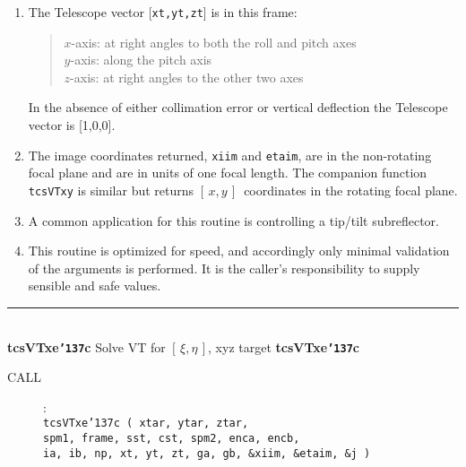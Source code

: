 \documentclass[12pt,fleqn,twoside]{article}
\renewcommand{\_}{{\tt\char'137}}     %
\newcommand{\radec}     {$[\,\alpha,\delta\,]$}
\newcommand{\hadec}     {$[\,h,\delta\,]$}
\newcommand{\xieta}     {$[\,\xi,\eta\,]$}
\newcommand{\azel}      {$[\,Az,El~]$}
\newcommand{\xy}        {$[\,x,y\,]$}
\newcommand{\routine}[2]
{
  \newpage
  \rule{\textwidth}{0.3mm}\\ \nopagebreak
  {\Large {\bf #1} \hfill #2 \hfill {\bf #1}}
  \vspace{-1ex}
}
\newcommand{\call}[1]
{
  \goodbreak
  \begin{description}
    \item[CALL]: \\[0.5ex] \nopagebreak
        {\tt #1}
  \end{description}
  \vspace{-3ex}
}
\begin{document}
{\begin{enumerate}
\begin{tabbing}
         \> {\tt target } \> topocentric apparent \radec \\
         \> {\tt spm1   } \> identity matrix \\
         \> {\tt sst,cst} \> \radec\ $\Rightarrow$ \hadec \\
         \> {\tt spm2   } \> topocentric \hadec\ $\Rightarrow$ {\sc Aim}
      \end{tabbing}
      \begin{tabbing}
         xxx \= xxxxxxxxxx \= \kill
         \> {\tt frame  } \> {\tt AZEL\_TOPO} \\
         \> {\tt target } \> topocentric \azel\ (N thru E) \\
         \> {\tt spm1   } \> identity matrix \\
         \> {\tt sst,cst} \> not used \\
         \> {\tt spm2   } \> topocentric \azel\ $\Rightarrow$ {\sc Aim}
      \end{tabbing}

      ICRS $\approx$ FK5 J2000 to better than 25 mas.
\item The {\sc Telescope} vector [{\tt xt,yt,zt}] is in this frame:
      \begin{quote}
      $x$-axis:  at right angles to both the roll and pitch axes \\
      $y$-axis:  along the pitch axis \\
      $z$-axis:  at right angles to the other two axes
      \end{quote}
      In the absence of either collimation error or vertical deflection
      the {\sc Telescope} vector is [1,0,0].
\item The image coordinates returned,
      {\tt xiim} and {\tt etaim}, are in the
      non-rotating focal plane and are in units of one focal length.
      The companion function {\tt tcsVTxy} is similar but returns \xy\
      coordinates in the rotating focal plane.
\item A common application for this routine is controlling a tip/tilt
      subreflector.
\item This routine is optimized for speed, and accordingly only minimal
      validation of the arguments is performed.  It is the caller's
      responsibility to supply sensible and safe values.
\end{enumerate}
}
\routine{tcsVTxe\_c}{Solve VT for \xieta, xyz target}
\label{tcsVTxe_c}
\call{tcsVTxe\_c ( xtar, ytar, ztar, \\
\hspace*{5.5em} spm1, frame, sst, cst, spm2, enca, encb, \\
\hspace*{5.5em} ia, ib, np, xt, yt, zt, ga, gb, \&xiim, \&etaim, \&j ) }
\end{document}
